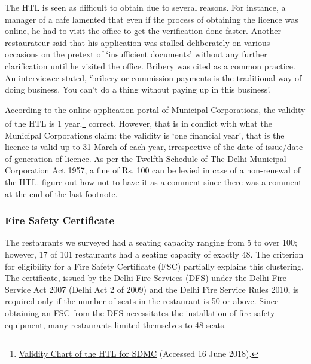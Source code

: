 \documentclass[a4paper, 12pt]{article}
\begin{document}
                    The HTL is seen as difficult to obtain due to several reasons. For instance, a manager of a cafe lamented that even if the process of obtaining the licence was online, he had to visit the office to get the verification done faster. Another restaurateur said 
that his application was stalled deliberately on various occasions on the pretext of ‘insufficient documents’ without any further clarification until he visited the office. Bribery was cited as a common practice. An interviewee stated, ‘bribery or commission payments is 
the traditional way of doing business. You can’t do a thing without paying up in this business’.
                    
                    According to the online application portal of Municipal Corporations, the validity of the HTL is 1 year.\footnote{\href{https://bit.ly/2Qzd92r}{Validity Chart of the HTL for SDMC} (Accessed 16 June 2018).}  %
correct. 
                    However, that is in conflict with what the Municipal Corporations claim: the validity is ‘one financial year’, that is the licence is valid up to 31 March of each year, irrespective of the date of issue/date of generation of licence. As per the Twelfth Schedule 
of The Delhi Municipal Corporation Act 1957, a fine of Rs. 100 can be levied in case of a non-renewal of the HTL. %
figure out how not to have it as a comment since there was a comment at the end of the last footnote.    
  
     
		\subsubsection{Fire Safety Certificate}
		The restaurants we surveyed had a seating capacity ranging from 5 to over 100; however, 17 of 101 restaurants had a seating capacity of exactly 48. The criterion for eligibility for a Fire Safety Certificate (FSC) partially explains this clustering. The 
certificate, issued by the Delhi Fire Services (DFS) under the Delhi Fire Service Act 2007 (Delhi Act 2 of 2009) and the Delhi Fire Service Rules 2010, is required only if the number of seats in the restaurant is 50 or above. Since obtaining an FSC from the DFS 
necessitates the installation of fire safety equipment, many restaurants limited themselves to 48 seats. %
		
\end{document}
